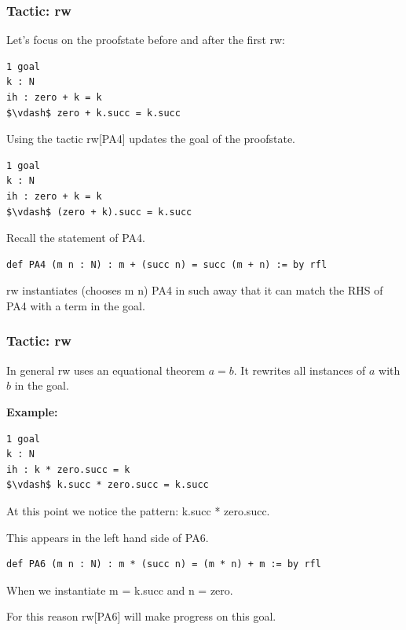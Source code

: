 \documentclass{beamer}
\theoremstyle{indentDefn} \newtheorem{defn}[]{Definition}
\begin{document}
\begin{frame}[fragile]
	\frametitle{Tactic: rw}

Let's focus on the proofstate before and after the first rw:
\begin{lstlisting}
1 goal
k : N
ih : zero + k = k
$\vdash$ zero + k.succ = k.succ
\end{lstlisting}
Using the tactic rw[PA4] updates the goal of the proofstate.
\begin{lstlisting}
1 goal
k : N
ih : zero + k = k
$\vdash$ (zero + k).succ = k.succ
\end{lstlisting}

Recall the statement of PA4.
	{\footnotesize\begin{lstlisting}
def PA4 (m n : N) : m + (succ n) = succ (m + n) := by rfl
	\end{lstlisting}}
	rw instantiates (chooses m n) PA4 in such away that it can match the RHS of PA4 with a term in the goal.
\end{frame}

\begin{frame}[fragile]
	\frametitle{Tactic: rw}
	
	In general rw uses an equational theorem $a = b$. It rewrites all instances of $a$ with $b$ in the goal.	
	
	\textbf{Example:}
	{\footnotesize\begin{lstlisting}
1 goal
k : N
ih : k * zero.succ = k
$\vdash$ k.succ * zero.succ = k.succ
	\end{lstlisting}}	
	At this point we notice the pattern: k.succ * zero.succ. 
	
	This appears in the left hand side of PA6.
{\footnotesize\begin{lstlisting}
def PA6 (m n : N) : m * (succ n) = (m * n) + m := by rfl
\end{lstlisting}}
When we instantiate m = k.succ and n = zero. 

For this reason rw[PA6] will make progress on this goal.
\end{frame}

\end{document}
